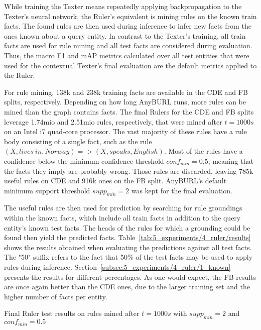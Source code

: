 While training the Texter means repeatedly applying backpropagation to the Texter's neural network, the Ruler's equivalent is mining rules on the known train facts. The found rules are then used during inference to infer new facts from the ones known about a query entity. In contrast to the Texter's training, all train facts are used for rule mining and all test facts are considered during evaluation. Thus, the macro F1 and mAP metrics calculated over all test entities that were used for the contextual Texter's final evaluation are the default metrics applied to the Ruler.

For rule mining, 138k and 238k training facts are available in the CDE and FB splits, respectively. Depending on how long AnyBURL runs, more rules can be mined than the graph contains facts. The final Rulers for the CDE and FB splits leverage 1.74mio and 2.51mio rules, respectively, that were mined after $t = 1000s$ on an Intel i7 quad-core processor. The vast majority of these rules have a rule body consisting of a single fact, such as the rule $(X, lives~in, Norway) => (X, speaks, English)$. Most of the rules have a confidence below the minimum confidence threshold $conf_{min} = 0.5$, meaning that the facts they imply are probably wrong. Those rules are discarded, leaving 785k useful rules on CDE and 916k ones on the FB split. AnyBURL's default minimum support threshold $supp_{min} = 2$ was kept for the final evaluation.

The useful rules are then used for prediction by searching for rule groundings within the known facts, which include all train facts in addition to the query entity's known test facts. The heads of the rules for which a grounding could be found then yield the predicted facts. Table~\ref{tab:5_experiments/4_ruler/results} shows the results obtained when evaluating the predictions against all test facts. The "50" suffix refers to the fact that 50\% of the test facts may be used to apply rules during inference. Section~\ref{subsec:5_experiments/4_ruler/1_known} presents the results for different percentages. As one would expect, the FB results are once again better than the CDE ones, due to the larger training set and the higher number of facts per entity.

\begin{table}[h]
    \centering
    
    \caption{Final Ruler test results on rules mined after $t = 1000s$ with $supp_{min} = 2$ and $conf_{min} = 0.5$}
    \label{tab:5_experiments/4_ruler/results}
\end{table}

